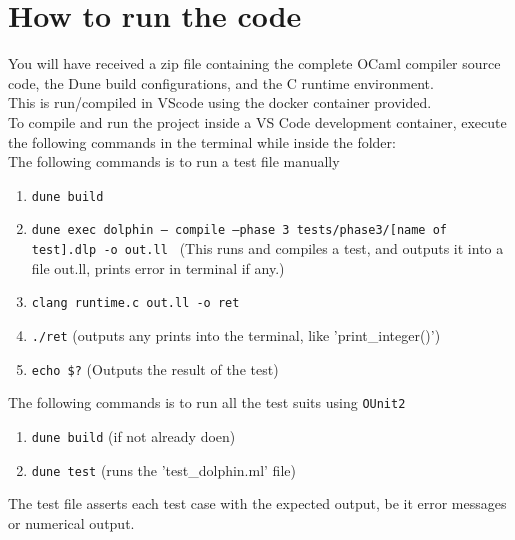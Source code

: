 \documentclass[12pt]{article}
\begin{document}
\section*{How to run the code}
You will have received a zip file containing the complete OCaml compiler source code, the Dune build configurations, and the C runtime environment.\\
\newline
This is run/compiled in VScode using the docker container provided.\\
To compile and run the project inside a VS Code development container, execute the following commands in the terminal while inside the folder:\\
The following commands is to run a test file manually
\begin{enumerate}
    \item \texttt{dune build} 
    \item \texttt{dune exec dolphin -- compile --phase 3 tests/phase3/[name of test].dlp -o out.ll  } (This runs and compiles a test, and outputs it into a file out.ll, prints error in terminal if any.)
    \item \texttt{clang runtime.c out.ll -o ret} 
    \item \texttt{./ret} (outputs any prints into the terminal, like 'print\_integer()')
    \item \texttt{echo \$?} (Outputs the result of the test)
\end{enumerate}
The following commands is to run all the test suits using \texttt{OUnit2}
\begin{enumerate}
    \item \texttt{dune build} (if not already doen)
    \item \texttt{dune test} (runs the 'test\_dolphin.ml' file) 
\end{enumerate}
The test file asserts each test case with the expected output, be it error messages or numerical output.
\end{document}
